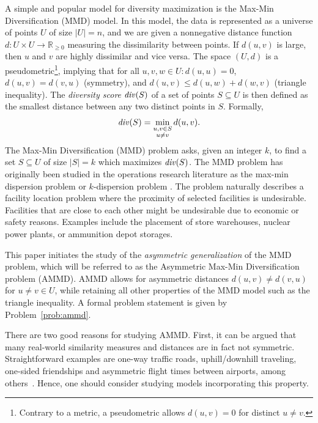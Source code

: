 A simple and popular model for diversity maximization is the Max-Min Diversification (MMD) model. In this model, the data is represented as a universe of points $U$ of size $|U|=n$, and we are given a nonnegative distance function $d: U \times U \to \mathbb{R}_{\geq 0}$ measuring the dissimilarity between points. If $d(u,v)$ is large, then $u$ and $v$ are highly dissimilar and vice versa. 
The space $(U,d)$ is a pseudometric\footnote{Contrary to a metric, a pseudometric allows $d(u,v)=0$ for distinct $u \neq v$.}, implying that for all $u,v,w \in U: d(u,u) = 0$, $d(u,v) = d(v,u)$ (symmetry), and $d(u,v) \leq d(u,w)+ d(w,v)$ (triangle inequality).
The \emph{diversity score} $\diver{S}$ of a set of points $S \subseteq U$ is then defined as the smallest distance between any two distinct points in $S$. Formally,
\begin{align}
\label{def:divscore}
\diver{S} = \min \limits_{\substack{u,v \in S \\ u \neq v}} d(u,v).
\end{align}
The Max-Min Diversification (MMD) problem asks, given an integer $k$, to find a set $S \subseteq U$ of size $|S| = k$ which maximizes $\diver{S}$.
The MMD problem has originally been studied in the operations research literature as the max-min dispersion problem or $k$-dispersion problem \cite{kuby1987programming,erkut1990discrete,tamir1991obnoxious,ravi1994heuristic}.
The problem naturally describes a facility location problem where the proximity of selected facilities is undesirable.
Facilities that are close to each other might be undesirable due to economic or safety reasons.
Examples include the placement of store warehouses, nuclear power plants, or ammunition depot storages.

This paper initiates the study of the \emph{asymmetric generalization} of the MMD problem, which will be referred to as the Asymmetric Max-Min Diversification problem (AMMD). AMMD allows for asymmetric distances $d(u,v) \neq d(v,u)$ for $u \neq v \in U$, while retaining all other properties of the MMD model such as the triangle inequality.
A formal problem statement is given by Problem~\ref{prob:ammd}.

There are two good reasons for studying AMMD.
First, it can be argued that many real-world similarity measures and distances are in fact not symmetric. Straightforward examples are one-way traffic roads, uphill/downhill traveling, one-sided friendships and asymmetric flight times between airports, among others~\cite{kunegis2013konect, snapnets, tsplib}. Hence, one should consider studying models incorporating this property.

